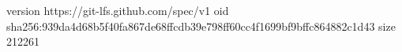 version https://git-lfs.github.com/spec/v1
oid sha256:939da4d68b5f40fa867de68ffcdb39e798ff60cc4f1699bf9bffc864882c1d43
size 212261

